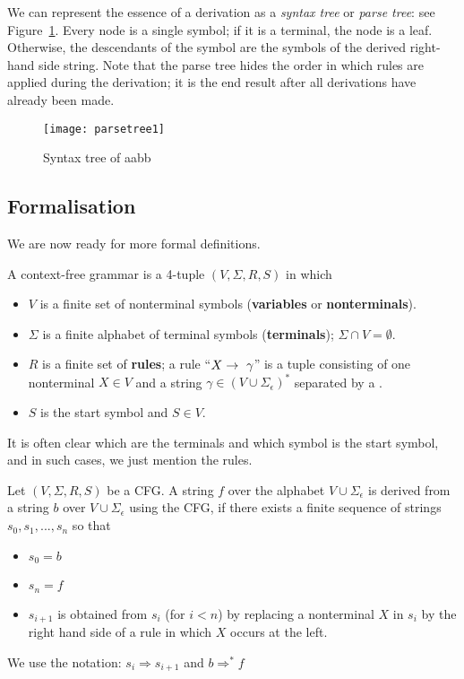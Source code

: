 We can represent the essence of a derivation as a {\em syntax tree} or
{\em parse tree}: see Figure~\ref{parsetree1}. Every node is a single symbol; if it is a terminal, the node is a leaf. Otherwise, the descendants of the symbol are the symbols of the derived right-hand side string. Note that the parse tree hides the order in which rules are applied
during the derivation; it is the end result after all derivations have already been made.

\medskip
\begin{figure}[h]
	\centering
	\texttt{[image: parsetree1]}
	\caption{Syntax tree of aabb \label{parsetree1}}
\end{figure}

\subsection{Formalisation}
We are now ready for more formal definitions.
\begin{definition}
A context-free grammar is a 4-tuple $(V,\Sigma,R,S)$ in which
\begin{itemize}
\item
$V$ is a finite set of nonterminal symbols (\textbf{variables} or
  \textbf{nonterminals}).
\item
$\Sigma$ is a finite alphabet of terminal symbols (\textbf{terminals}); $\Sigma
  \cap V = \emptyset$.
\item
$R$ is a finite set of \textbf{rules}; a rule ``$X \rightarrow~ \gamma$'' is a tuple
  consisting of one nonterminal $X\in V$ and a string $\gamma\in (V \cup
  \Sigma_\epsilon)^*$ separated by a \rpijl.
\item $S$ is the start symbol and $S \in V$.
\end{itemize}
\end{definition}

It is often clear which are the terminals and which symbol is the
start symbol, and in such cases, we just mention the rules.

\begin{definition}
Let $(V,\Sigma,R,S)$ be a CFG.
A string $f$ over the alphabet $V \cup \Sigma_\epsilon$ is derived
from a string $b$ over $V \cup \Sigma_\epsilon$ using the CFG, if
there exists a finite sequence of strings $s_0, s_1, ..., s_n$
so that
\begin{itemize}
\item $s_0 = b$
\item $s_n = f$
\item $s_{i+1}$ is obtained from $s_i$ (for $i < n$) by replacing a nonterminal $X$ in
 $s_i$ by the right hand side of a rule in which
 $X$ occurs at the left.
\end{itemize}

We use the notation: $s_i \Rightarrow s_{i+1}$ and $b \Rightarrow^* f$
\end{definition}

